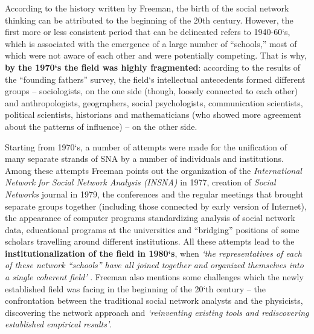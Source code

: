 \documentclass[11pt]{article} %
\begin{document}
According to the history written by Freeman, the birth of the social network thinking can be attributed to the beginning of the 20th century. However, the first more or less consistent period that can be delineated refers to 1940-60`s, which is associated with the emergence of a large number of “schools,” most of which were not aware of each other and were potentially competing. That is why, \textbf{by the 1970`s the field was highly fragmented}: according to the results of the “founding fathers” survey, the field`s intellectual antecedents formed different groups -- sociologists, on the one side (though, loosely connected to each other) and anthropologists, geographers, social psychologists, communication scientists, political scientists, historians and mathematicians (who showed more agreement about the patterns of influence) -- on the other side. \medskip 

Starting from 1970`s, a number of attempts were made for the unification of many separate strands of SNA by a number of individuals and institutions. Among these attempts Freeman points out the organization of the \textit{International Network for Social Network Analysis (INSNA)} in 1977, creation of \textit{Social Networks} journal in 1979, the conferences and the regular meetings that brought separate groups together (including those connected by early version of Internet), the appearance of computer programs standardizing analysis of social network data, educational programs at the universities and “bridging” positions of some scholars travelling around different institutions. All these attempts lead to the \textbf{institutionalization of the field in 1980`s}, when \textit{`the representatives of each of these network “schools” have all joined together and organized themselves into a single coherent field'} \citep[p.~135]{SNAdev}. Freeman also mentions some challenges which the newly established field was facing in the beginning of the 20`th century -- the confrontation between the traditional social network analysts and the physicists, discovering the network approach and \textit{`reinventing existing tools and rediscovering established empirical results'}. \medskip 
\end{document}
